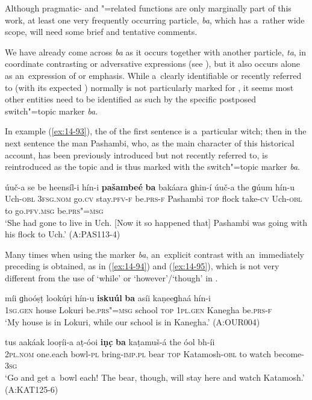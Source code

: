 Although pragmatic- and "=related functions are only marginally part of this work, at least one very frequently occurring particle, \textit{ba}, which has a~rather wide scope, will need some brief and tentative comments.



We have already come across \textit{ba} as it occurs together with another particle, \textit{ta}, in coordinate contrasting or adversative expressions (see ), but it also occurs alone as an~expression of  or emphasis. While a~clearly identifiable or recently referred to  (with its expected ) normally is not particularly marked for , it seems most other entities need to be identified as such by the specific postposed switch"=topic \citep[149]{andrews2007} marker \textit{ba}.



In example (\ref{ex:14-93}), the  of the first sentence is a~particular witch; then in the next sentence the man Pashambi, who, as the main character of this historical account, has been previously introduced but not recently referred to, is reintroduced as the topic   and is thus marked with the switch"=topic marker \textit{ba}.

\ea
\label{ex:14-93}
\gll úuč-a se  be heensíl-i  hín-i \textbf{pašambeé} \textbf{ba} bakáara ɡhin-í úuč-a the ɡúum hín-u \\
Uch-\textsc{obl} \textsc{3fsg.nom} go.\textsc{cv} stay.\textsc{pfv-f} be.\textsc{prs-f} Pashambi  \textsc{top} flock take-\textsc{cv} Uch-\textsc{obl} to go.\textsc{pfv.msg} be.\textsc{prs"=msg} \\
\glt `She had gone to live in Uch. [Now it so happened that] Pashambi was going with his flock to Uch.' (A:PAS113-4)
\z

Many times when using the marker \textit{ba}, an~explicit contrast with an~immediately preceding  is obtained, as in (\ref{ex:14-94}) and (\ref{ex:14-95}), which is not very different from the use of `while' or `however'/`though' in \iliEnglish.

\begin{exe}
\ex
\label{ex:14-94}
\gll míi ɡhoóṣṭ lookúṛi hín-u \textbf{iskuúl} \textbf{ba} asíi kaṇeeɡhaá hín-i\\
\textsc{1sg.gen} house Lokuri be.\textsc{prs"=msg} school \textsc{top} \textsc{1pl.gen} Kanegha be.\textsc{prs-f}\\
\glt `My house is in Lokuri, while our school is in Kanegha.' (A:OUR004)

\ex
\label{ex:14-95}
\gll tus aakáak looṛíi-a aṭ-óoi \textbf{iṇc̣} \textbf{ba}  kaṭamuš-á the óol bh-íi \\
\textsc{2pl.nom} one.each bowl-\textsc{pl} bring-\textsc{imp.pl} bear \textsc{top} Katamosh-\textsc{obl} to watch become-\textsc{3sg } \\
\glt `Go and get a~bowl each! The bear, though, will stay here and watch Katamosh.' (A:KAT125-6)
\end{exe}

